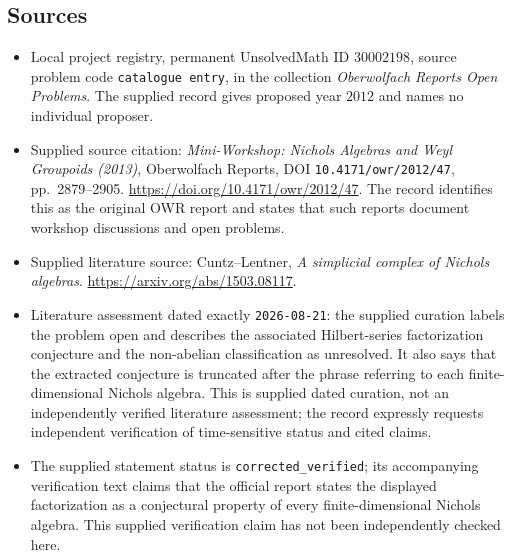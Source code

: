 \documentclass[11pt]{article}
\begin{document}
\subsection{Sources}
\begin{itemize}
\item Local project registry, permanent UnsolvedMath ID \(30002198\), source problem code \texttt{catalogue entry}, in the collection \emph{Oberwolfach Reports Open Problems}. The supplied record gives proposed year \(2012\) and names no individual proposer.
\item Supplied source citation: \emph{Mini-Workshop: Nichols Algebras and Weyl Groupoids (2013)}, Oberwolfach Reports, DOI \texttt{10.4171/owr/2012/47}, pp.~2879--2905. \url{https://doi.org/10.4171/owr/2012/47}. The record identifies this as the original OWR report and states that such reports document workshop discussions and open problems.
\item Supplied literature source: Cuntz--Lentner, \emph{A simplicial complex of Nichols algebras}. \url{https://arxiv.org/abs/1503.08117}.
\item Literature assessment dated exactly \texttt{2026-08-21}: the supplied curation labels the problem open and describes the associated Hilbert-series factorization conjecture and the non-abelian classification as unresolved. It also says that the extracted conjecture is truncated after the phrase referring to each finite-dimensional Nichols algebra. This is supplied dated curation, not an independently verified literature assessment; the record expressly requests independent verification of time-sensitive status and cited claims.
\item The supplied statement status is \texttt{corrected\_verified}; its accompanying verification text claims that the official report states the displayed factorization as a conjectural property of every finite-dimensional Nichols algebra. This supplied verification claim has not been independently checked here.
\end{itemize}
\end{document}

